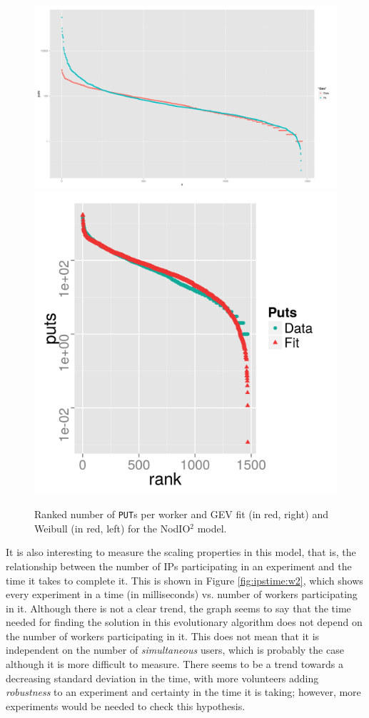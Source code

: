 \documentclass[journal,onecolumn]{IEEEtran}
\begin{document}
\begin{figure}[!htb]
\centering
\includegraphics[width=0.49\linewidth]{img/gev-fit-ww.png}
\includegraphics[width=0.49\linewidth]{img/weibull-fit-ww.png}
\caption{Ranked number of {\tt PUT}s per worker and GEV fit (in red, right) and Weibull (in red, left) for the {\sf NodIO$^2$} model. }  
\label{fig:gev:w2}
\end{figure}
%
It is also interesting to measure the scaling properties in this
model, that is, the relationship between the number of IPs
participating in an experiment and the time it takes to complete
it. This is shown in Figure \ref{fig:ipstime:w2}, which shows every
experiment in a time (in milliseconds) vs. number of workers participating
in it. Although there is not a clear trend, the graph seems to say
that the time needed for finding the solution in this evolutionary
algorithm does not depend on the number of workers participating in
it. This does not mean that it is independent on the number of {\em
  simultaneous} users, which is probably the case although it is more
difficult to measure. There seems to be a trend towards a decreasing
standard deviation in the time, with more volunteers adding {\em
  robustness} to an experiment and certainty in the time it is taking;
however, more experiments would be needed to check this hypothesis.
\end{document}
